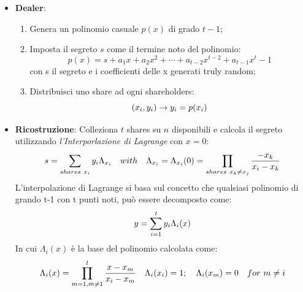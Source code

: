 \documentclass{book}
\begin{document}
\begin{itemize}
    \item \textbf{Dealer}:\
          \begin{enumerate}
              \item Genera un polinomio casuale \(p(x)\) di grado \(t-1\);
              \item Imposta il segreto \(s\) come il termine noto del polinomio:
                    \begin{equation*}
                        p(x)=s+a_{1}x+a_{2}x^{2}+ \cdots +a_{t-2}x^{t-2}+a_{t-1}x^t-1
                    \end{equation*}
                    con s il segreto e i coefficienti delle x generati truly random;
              \item Distribuisci uno share ad ogni shareholders:
                    \begin{equation*}
                        \centering
                        (x_{i},y_{i})\rightarrow y_{i}=p(x_{i})
                    \end{equation*}
          \end{enumerate}
    \item \textbf{Ricostruzione}: Colleziona \(t\) shares su \(n\) disponibili e calcola il segreto utilizzando \emph{l'Interporlazione di Lagrange} con \(x=0\):
          \begin{equation*}
              \centering
              s=\sum_{shares\ x_i}{y_{i}\Lambda_{x_{i}}}\quad with\quad\Lambda_{x_{i}}=\Lambda_{x_{i}}(0)=\prod_{shares\ x_{k}\neq x_{j}}{\frac{-x_{k}}{x_{i}-x_{k}}}
          \end{equation*}
          L'interpolazione di Lagrange si basa sul concetto che qualsiasi polinomio di grando t-1 con t punti noti, può essere decomposto come:
          \begin{equation*}
              \centering
              y=\sum_{i=1}^{t}{y_{i}\Lambda_{i}(x)}
          \end{equation*}
          In cui \(\Lambda_{i}(x)\) è la base del polinomio calcolata come:
          \begin{equation*}
              \centering
              \Lambda_{i}(x)=\prod_{m=1,m\neq1}^{l}{\frac{x-x_{m}}{x_{i}-x_{m}}}\quad \Lambda_{i}(x_{i})=1;\quad \Lambda_{i}(x_{m})=0\quad for\ m\neq i
          \end{equation*}
\end{itemize}
\end{document}
